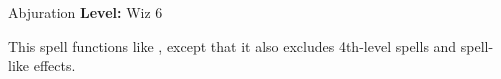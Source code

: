 {Abjuration}
{
	\textbf{Level:}
	Wiz 6\\
}
{
	This spell functions like , except that it also excludes 4th-level spells and spell-like effects.

}
